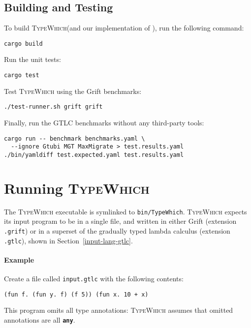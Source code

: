 \documentclass{article}
\newcommand{\system}{\textsc{TypeWhich}\xspace}
\newcommand{\kw}[1]{\textbf{\texttt{#1}}}
\begin{document}
\subsection{Building and Testing}

To build \system (and our implementation of \citet{rastogi:gti}), run the
following command:

\begin{verbatim}
cargo build
\end{verbatim}

Run the unit tests:

\begin{verbatim}
cargo test
\end{verbatim}

Test \system using the Grift benchmarks:

\begin{verbatim}
./test-runner.sh grift grift
\end{verbatim}

Finally, run the GTLC benchmarks without any third-party tools:

\begin{verbatim}
cargo run -- benchmark benchmarks.yaml \
  --ignore Gtubi MGT MaxMigrate > test.results.yaml
./bin/yamldiff test.expected.yaml test.results.yaml
\end{verbatim}

\section{Running \system}

The \system executable is symlinked to \texttt{bin/TypeWhich}. \system
expects its input program to be in a single file, and written in either
Grift (extension \texttt{.grift}) or in a superset of the 
gradually typed lambda calculus (extension \texttt{.gtlc}), shown in
Section~\ref{input-lang-gtlc}.

\paragraph{Example}
Create a file called \texttt{input.gtlc} with the following contents:

\begin{verbatim}
(fun f. (fun y. f) (f 5)) (fun x. 10 + x)
\end{verbatim}

This program omits all type annotations: \system assumes that omitted
annotations are all \kw{any}.
\end{document}
